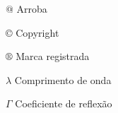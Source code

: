 
\begin{simbolos} \itemsep -1pt
	\item[$ @ $] Arroba
	\item[$ © $] Copyright
	\item[$ ® $] Marca registrada
	\item[$ \lambda $] Comprimento de onda
	\item[$ \Gamma $] Coeficiente de reflexão
\end{simbolos}
